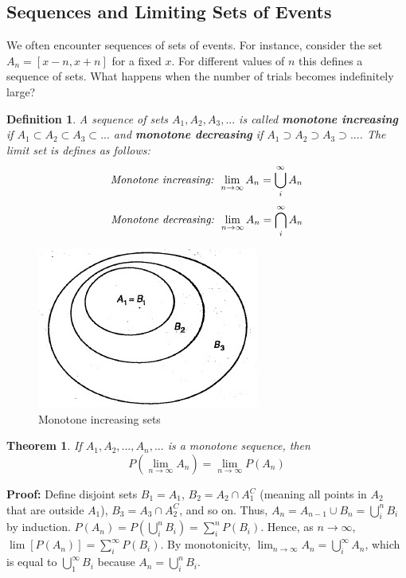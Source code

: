 \documentclass{article}
\newtheorem{definition}{Definition}[section]
\newtheorem{theorem}{Theorem}[section]
\begin{document}
\subsection{Sequences and Limiting Sets of Events}
We often encounter sequences of sets of events. For instance, consider the set \(A_n = [x-n,x+n]\) for a fixed \(x\). For different values of \(n\) this defines a sequence of sets. What happens when the number of trials becomes indefinitely large? 
\begin{definition}
    A sequence of sets \(A_1, A_2, A_3, ...\) is called \textbf{monotone increasing} if \(A_1 \subset A_2 \subset A_3 \subset ...\) and \textbf{monotone decreasing} if \(A_1 \supset A_2 \supset A_3 \supset ...\). The limit set is defines as follows:
    \begin{equation*}
        \text{\textit{Monotone increasing: }} \lim_{n \rightarrow \infty} A_n = \bigcup_{i}^{\infty} A_n
    \end{equation*}
    \begin{equation*}
        \text{\textit{Monotone decreasing: }} \lim_{n \rightarrow \infty} A_n = \bigcap_{i}^{\infty} A_n
    \end{equation*}
\end{definition}
\begin{figure} [h]
    \centering
    \includegraphics{pics/monotone sets.jpg}
    \caption{Monotone increasing sets}
\end{figure}
\begin{theorem}
    If \(A_1, A_2, ..., A_n, ...\) is a monotone sequence, then
    \begin{equation*}
        P(\lim_{n \rightarrow \infty} A_n)= \lim_{n \rightarrow \infty} P(A_n)
    \end{equation*}
\end{theorem}
\textbf{Proof:} Define disjoint sets \(B_1=A_1\), \(B_2=A_2 \cap A_1^C\) (meaning all points in \(A_2\) that are outside \(A_1\)), \(B_3 = A_3 \cap A_2^C\), and so on. Thus, \(A_n = A_{n-1} \cup B_n = \bigcup_{i}^{n} B_i\) by induction. \(P(A_n) = P(\bigcup_{i}^{n} B_i) = \sum_{i}^{n} P(B_i)\). Hence, as \(n \rightarrow \infty\), \(\lim [P(A_n)] = \sum_{i}^{\infty} P(B_i)\). By monotonicity, \(\lim_{n \rightarrow \infty} A_n = \bigcup_{i}^{\infty} A_n\), which is equal to \(\bigcup_{1}^{\infty} B_i\) because \(A_n = \bigcup_{i}^{n} B_i\).
\end{document}
